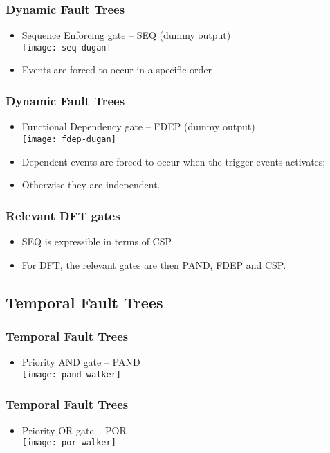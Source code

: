 \begin{frame}
\frametitle{Dynamic Fault Trees}
\begin{itemize}
  \item Sequence Enforcing gate -- SEQ (dummy output)\\
    \texttt{[image: seq-dugan]} 
  \item Events are forced to occur in a specific order
\end{itemize}
\end{frame}

\begin{frame}
\frametitle{Dynamic Fault Trees}
\begin{itemize}
  \item Functional Dependency gate -- FDEP (dummy output)\\
    \texttt{[image: fdep-dugan]}
  \item Dependent events are forced to occur when the trigger events activates;
  \item Otherwise they are independent.
\end{itemize}
\end{frame}

\begin{frame}
\frametitle{Relevant DFT gates}
\begin{itemize}
  \item SEQ is expressible in terms of CSP.
  \item For DFT, the relevant gates are then PAND, FDEP and CSP. 
\end{itemize}
\end{frame}

\subsection{Temporal Fault Trees}

\begin{frame}
\frametitle{Temporal Fault Trees}
\begin{itemize}
  \item Priority AND gate -- PAND\\
  \texttt{[image: pand-walker]}
\end{itemize}
\end{frame}

\begin{frame}
\frametitle{Temporal Fault Trees}
\begin{itemize}
  \item Priority OR gate -- POR\\
  \texttt{[image: por-walker]}
\end{itemize}
\end{frame}

